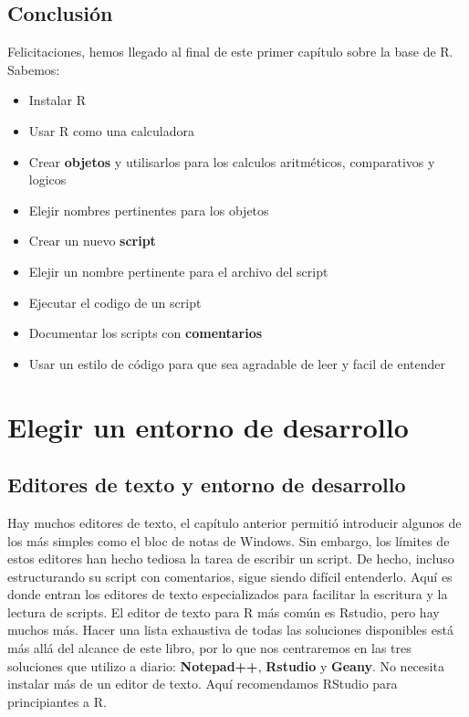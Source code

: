 \documentclass[]{book}
\providecommand{\tightlist}{%
  \setlength{\itemsep}{0pt}\setlength{\parskip}{0pt}}
\begin{document}
\section{Conclusión}\label{conclusion}

Felicitaciones, hemos llegado al final de este primer capítulo sobre la
base de R. Sabemos:

\begin{itemize}
\tightlist
\item
  Instalar R
\item
  Usar R como una calculadora
\item
  Crear \textbf{objetos} y utilisarlos para los calculos aritméticos,
  comparativos y logicos
\item
  Elejir nombres pertinentes para los objetos
\item
  Crear un nuevo \textbf{script}
\item
  Elejir un nombre pertinente para el archivo del script
\item
  Ejecutar el codigo de un script
\item
  Documentar los scripts con \textbf{comentarios}
\item
  Usar un estilo de código para que sea agradable de leer y facil de
  entender
\end{itemize}

\chapter{Elegir un entorno de desarrollo}\label{IDE}

\section{Editores de texto y entorno de
desarrollo}\label{editores-de-texto-y-entorno-de-desarrollo}

Hay muchos editores de texto, el capítulo anterior permitió introducir
algunos de los más simples como el bloc de notas de Windows. Sin
embargo, los límites de estos editores han hecho tediosa la tarea de
escribir un script. De hecho, incluso estructurando su script con
comentarios, sigue siendo difícil entenderlo. Aquí es donde entran los
editores de texto especializados para facilitar la escritura y la
lectura de scripts. El editor de texto para R más común es Rstudio, pero
hay muchos más. Hacer una lista exhaustiva de todas las soluciones
disponibles está más allá del alcance de este libro, por lo que nos
centraremos en las tres soluciones que utilizo a diario:
\textbf{Notepad++}, \textbf{Rstudio} y \textbf{Geany}. No necesita
instalar más de un editor de texto. Aquí recomendamos RStudio para
principiantes a R.
\end{document}

